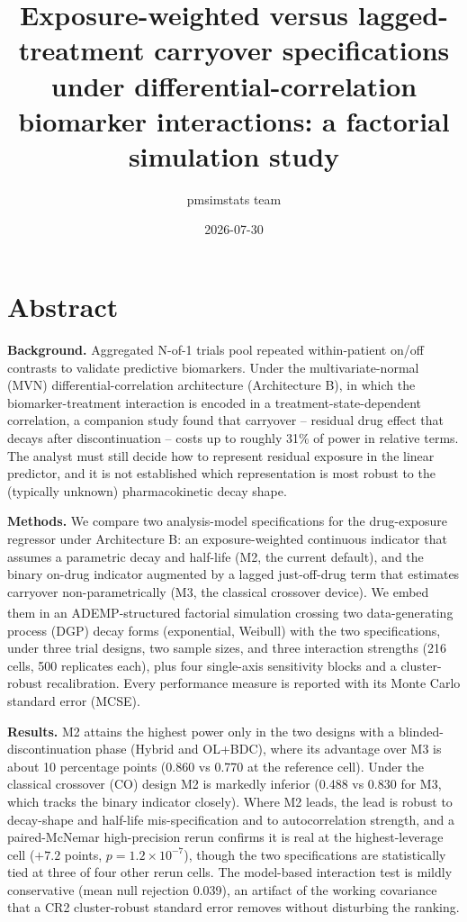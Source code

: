 \documentclass[
  11pt,
]{article}
\title{Exposure-weighted versus lagged-treatment carryover specifications under differential-correlation biomarker interactions: a factorial simulation study}
\author{pmsimstats team}
\date{2026-07-30}
\begin{document}
\maketitle

\section*{Abstract}\label{abstract}

\textbf{Background.} Aggregated N-of-1 trials pool repeated within-patient
on/off contrasts to validate predictive biomarkers. Under the
multivariate-normal (MVN) differential-correlation architecture
(Architecture B), in which the biomarker-treatment interaction is
encoded in a treatment-state-dependent correlation, a companion study
found that carryover -- residual drug effect that decays after
discontinuation -- costs up to roughly 31\% of power in relative
terms. The analyst must still decide how to represent residual
exposure in the linear predictor, and it is not established which
representation is most robust to the (typically unknown)
pharmacokinetic decay shape.

\textbf{Methods.} We compare two analysis-model specifications for the
drug-exposure regressor under Architecture B: an exposure-weighted
continuous indicator that assumes a parametric decay and half-life
(M2, the current default), and the binary on-drug indicator augmented
by a lagged just-off-drug term that estimates carryover
non-parametrically (M3, the classical crossover device). We embed
them in an ADEMP-structured factorial simulation\textsuperscript{} crossing two data-generating process (DGP)
decay forms (exponential, Weibull) with the two specifications, under
three trial designs, two sample sizes, and three interaction
strengths (216 cells, 500 replicates each), plus four single-axis
sensitivity blocks and a cluster-robust recalibration. Every
performance measure is reported with its Monte Carlo standard error
(MCSE).

\textbf{Results.} M2 attains the highest power only in the two designs
with a blinded-discontinuation phase (Hybrid and OL+BDC), where its
advantage over M3 is about 10 percentage points (0.860 vs 0.770 at
the reference cell). Under the classical crossover (CO) design M2 is
markedly inferior (0.488 vs 0.830 for M3, which tracks the binary
indicator closely). Where M2 leads, the lead is robust to decay-shape
and half-life mis-specification and to autocorrelation strength, and
a paired-McNemar high-precision rerun confirms it is real at the
highest-leverage cell (\(+7.2\) points, \(p = 1.2 \times 10^{-7}\)),
though the two specifications are statistically tied at three of
four other rerun cells. The model-based interaction test is mildly
conservative (mean null rejection 0.039), an artifact of the working
covariance that a CR2 cluster-robust standard error removes without
disturbing the ranking.
\end{document}
